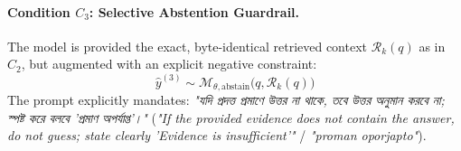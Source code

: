 \paragraph{Condition $C_3$: Selective Abstention Guardrail.} The model is provided the exact, byte-identical retrieved context $\mathcal{R}_k(q)$ as in $C_2$, but augmented with an explicit negative constraint:
\begin{equation}
    \hat{y}^{(3)} \sim \mathcal{M}_{\theta, \text{abstain}}\big(q, \mathcal{R}_k(q)\big)
\end{equation}
The prompt explicitly mandates: \foreignlanguage{bengali}{\emph{"যদি প্রদত্ত প্রমাণে উত্তর না থাকে, তবে উত্তর অনুমান করবে না; স্পষ্ট করে বলবে 'প্রমাণ অপর্যাপ্ত'।"}} (\emph{"If the provided evidence does not contain the answer, do not guess; state clearly 'Evidence is insufficient'"} / \emph{"proman oporjapto"}).

